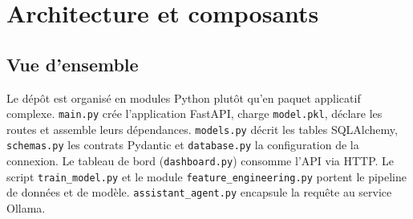 \documentclass[11pt,a4paper]{report}
\newcommand{\code}[1]{\texttt{#1}}
\begin{document}
\chapter{Architecture et composants}
\section{Vue d'ensemble}
Le dépôt est organisé en modules Python plutôt qu'en paquet applicatif
complexe. \code{main.py} crée l'application FastAPI, charge
\code{model.pkl}, déclare les routes et assemble leurs dépendances.
\code{models.py} décrit les tables SQLAlchemy, \code{schemas.py} les contrats
Pydantic et \code{database.py} la configuration de la connexion. Le tableau de
bord (\code{dashboard.py}) consomme l'API via HTTP. Le script
\code{train\_model.py} et le module \code{feature\_engineering.py} portent le
pipeline de données et de modèle. \code{assistant\_agent.py} encapsule la
requête au service Ollama.
\end{document}
